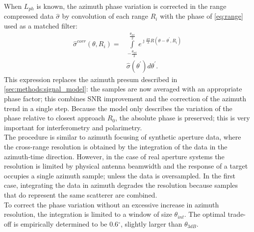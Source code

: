 When $L_{ph}$ is known, the azimuth phase variation is corrected in the range compressed data $\hat{\sigma}$ by convolution of each range $R_{i}$ with the phase of \eqref{eq:range} used as a matched filter:
\begin{equation}\label{eq:correction}
	\begin{aligned}
		\hat{\sigma}^{corr}\left(\theta, R_{i}\right) = &\int\limits_{-\frac{\theta_{int}}{2}}^{\frac{\theta_{int}}{2}}e^{\jmath \frac{4\pi}{\lambda}R\left(\theta - \theta^{\prime}, R_{i}\right)}\\
		&\hat{\sigma}\left(\theta^\prime\right) d\theta^\prime.
	\end{aligned}
\end{equation}
This expression replaces the azimuth presum described in \autoref{sec:methods:signal_model}: the samples are now averaged with an appropriate phase factor; this combines SNR improvement and the correction of the azimuth trend in a single step. Because the model only describes the variation of the phase relative to closest approach $R_{0}$, the absolute phase is preserved; this is very important for interferometry and polarimetry.\\
The procedure is similar to azimuth focusing of synthetic aperture data, where the cross-range resolution is obtained by the integration of the data in the azimuth-time direction. However, in the case of real aperture systems the resolution is limited by physical antenna beamwidth and the response of a target  occupies a single azimuth sample; unless the data is oversampled. In the first case, integrating the data in azimuth degrades the resolution because samples that do represent the same scatterer are combined.\\ To correct the phase variation without an excessive increase in azimuth resolution, the integration is limited to a window of size $\theta_{int}$. The optimal trade-off is empirically determined to be 0.6$^\circ$, slightly larger than $\theta_{3dB}$.
